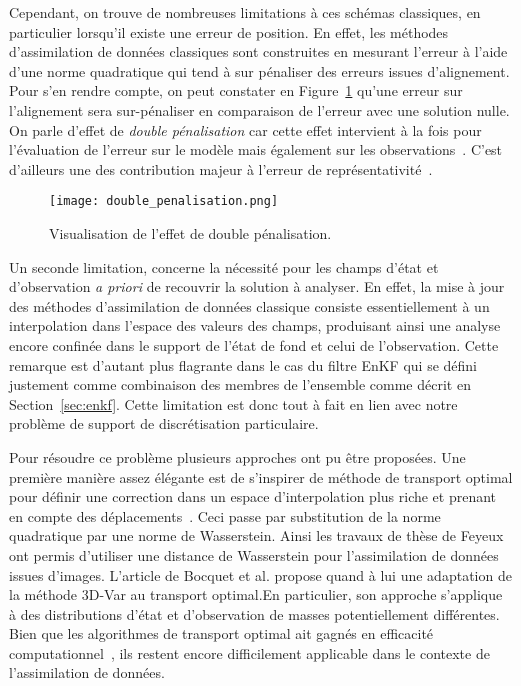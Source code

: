 Cependant, on trouve de nombreuses limitations à ces schémas classiques, en particulier lorsqu'il existe une erreur de position. En effet, les méthodes d'assimilation de données classiques sont construites en mesurant l'erreur à l'aide d'une norme quadratique qui tend à sur pénaliser des erreurs issues d'alignement. Pour s'en rendre compte, on peut constater en Figure~\ref{fig:double_penalization_error_} qu'une erreur sur l'alignement sera sur-pénaliser en comparaison de l'erreur avec une solution nulle. On parle d'effet de \textit{double pénalisation} car cette effet intervient à la fois pour l'évaluation de l'erreur sur le modèle mais également sur les observations~\cite{amodei2009}. C'est d’ailleurs une des contribution majeur à l'erreur de représentativité~\cite{janjic2018}.

\begin{figure}[h]
    \centering
    \texttt{[image: double\_penalisation.png]}
    \caption{Visualisation de l'effet de double pénalisation.}
    \label{fig:double_penalization_error_}
\end{figure}

Un seconde limitation, concerne la nécessité pour les champs d'état et d'observation \textit{a priori} de recouvrir la solution à analyser. En effet, la mise à jour des méthodes d'assimilation de données classique consiste essentiellement à un interpolation dans l'espace des valeurs des champs, produisant ainsi une analyse encore confinée dans le support de l'état de fond et celui de l'observation. Cette remarque est d'autant plus flagrante dans le cas du filtre EnKF qui se défini justement comme combinaison des membres de l'ensemble comme décrit en Section~\ref{sec:enkf}. Cette limitation est donc tout à fait en lien avec notre problème de support de discrétisation particulaire.


Pour résoudre ce problème plusieurs approches ont pu être proposées. Une première manière assez élégante est de s'inspirer de méthode de transport optimal pour définir une correction dans un espace d'interpolation plus riche et prenant en compte des déplacements~\cite{villani2009optimal,benamou_computational_2000}. Ceci passe par substitution de la norme quadratique par une norme de Wasserstein. Ainsi les travaux de thèse de Feyeux~\cite{feyeux_transport_2016} ont permis d'utiliser une distance de Wasserstein pour l'assimilation de données issues d'images. L'article de Bocquet et al. \cite{bocquet_bridging_2023} propose quand à lui une adaptation de la méthode 3D-Var au transport optimal.En particulier, son approche s'applique à des distributions d'état et d'observation de masses potentiellement différentes. Bien que les algorithmes de transport optimal ait gagnés en efficacité computationnel~\cite{cuturi_2014,peyre_cuturi_2019,Simsekli2018SlicedWassersteinFN}, ils restent encore difficilement applicable dans le contexte de l'assimilation de données.

